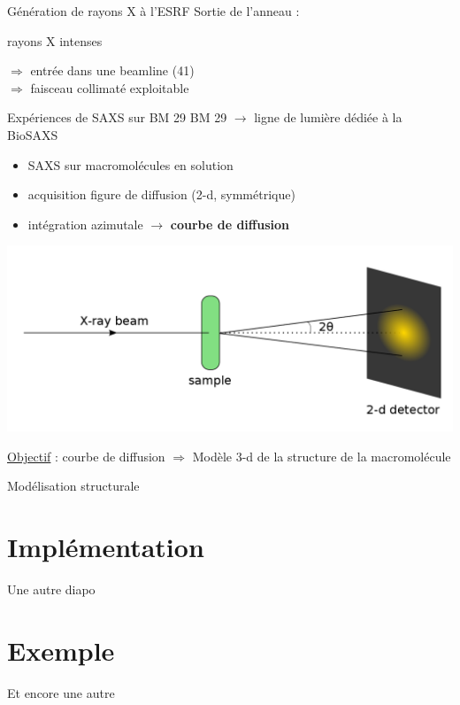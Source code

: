 \documentclass{beamer}
\begin{document}
\begin{frame}{G\'en\'eration de rayons X \`a l'ESRF}
Sortie de l'anneau :\\
\begin{minipage}{0.45\linewidth}
    \begin{center}
    \vspace{-0.8cm}
    rayons X intenses\\
    \end{center}
\end{minipage}
\begin{minipage}{0.50\linewidth}
    $\Rightarrow$ entr\'ee dans une beamline (41)\\
    $\Rightarrow$ faisceau collimat\'e exploitable\\
\end{minipage}
\end{frame}

\begin{frame}{Exp\'eriences de SAXS sur BM 29}
BM 29 $\rightarrow$ ligne de lumi\`ere d\'edi\'ee \`a la BioSAXS\\
\begin{itemize}
  \item SAXS sur macromol\'ecules en solution
  \item acquisition figure de diffusion (2-d, symm\'etrique)
  \item int\'egration azimutale $\rightarrow$ \textbf{courbe de diffusion}
\end{itemize}

\begin{minipage}{\linewidth}
    \begin{flushleft}
    \includegraphics[scale=0.2]{schemaSAXS.png}
    \end{flushleft}
\end{minipage}

\underline{Objectif} : courbe de diffusion $\Rightarrow$ Mod\`ele 3-d 
de la structure de la macromol\'ecule
\end{frame}

\begin{frame}{Mod\'elisation structurale}
\lipsum[1]
\end{frame}

\section{Impl\'ementation}%

\begin{frame}{Une autre diapo}
\lipsum[1]
\end{frame}


\section{Exemple}%

\begin{frame}{Et encore une autre}
\lipsum[1]
\end{frame}
\end{document}
